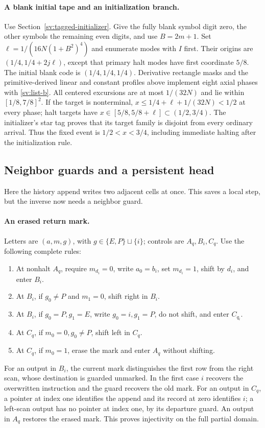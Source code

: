 \paragraph{A blank initial tape and an initialization branch.}
Use Section~\ref{sv:tagged-initializer}.  Give the fully blank symbol
digit zero, the other symbols the remaining even digits, and use
$B=2m+1$.  Set $\ell=1/(16N(1+B^2)^4)$ and enumerate modes with
$I$ first.  Their origins are $(1/4,1/4+2j\ell)$, except that
primary halt modes have first coordinate $5/8$.  The initial blank
code is $(1/4,1/4,1/4)$.  Derivative rectangle masks and the
primitive-derived linear and constant profiles above implement eight
axial phases with \eqref{sv:list-b}.  All centered excursions are at
most $1/(32N)$ and lie within $[1/8,7/8]^2$.  If the target is
nonterminal, $x\le1/4+\ell+1/(32N)<1/2$ at every phase;
halt targets have $x\in[5/8,5/8+\ell]\subset(1/2,3/4)$.
The initializer's star tag proves that its target family is disjoint
from every ordinary arrival.  Thus the fixed event is $1/2<x<3/4$,
including immediate halting after the initialization rule.

\subsection{Neighbor guards and a persistent head}
\label{sv:guarded}
Here the history append writes two adjacent cells at once.  This saves a
local step, but the inverse now needs a neighbor guard.

\paragraph{An erased return mark.}
Letters are $(a,m,g)$, with $g\in\{E,P\}\sqcup\{i\}$; controls
are $A_q,B_i,C_q$.  Use the following complete rules:
\begin{enumerate}
\item At nonhalt $A_q$, require $m_{d_i}=0$, write $a_0=b_i$,
set $m_{d_i}=1$, shift by $d_i$, and enter $B_i$.
\item At $B_i$, if $g_0\ne P$ and $m_1=0$, shift right in $B_i$.
\item At $B_i$, if $g_0=P,g_1=E$, write $g_0=i,g_1=P$,
do not shift, and enter $C_{q_i}$.
\item At $C_q$, if $m_0=0,g_0\ne P$, shift left in $C_q$.
\item At $C_q$, if $m_0=1$, erase the mark and enter $A_q$ without
shifting.
\end{enumerate}
For an output in $B_i$, the current mark distinguishes the first row
from the right scan, whose destination is guarded unmarked.  In the
first case $i$ recovers the overwritten instruction and the guard recovers
the old mark.  For an output in $C_q$, a pointer at index one identifies
the append and its record at zero identifies $i$; a left-scan output
has no pointer at index one, by its departure guard.  An output in
$A_q$ restores the erased mark.  This proves injectivity on the full
partial domain.

